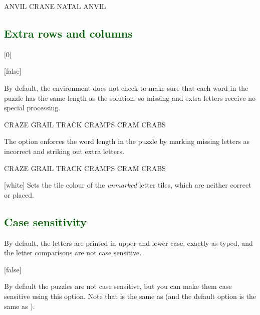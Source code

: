 \documentclass[svgnames]{report}
\newcommand\Section[1]{\subsection{\textcolor{DarkGreen}{#1}}}
\begin{document}
  \begin{example}
    \begin{wordle}[letterstyle={rounded corners}]{ANVIL}
      CRANE
      NATAL
      ANVIL
    \end{wordle}
  \end{example}


  \Section{Extra rows and columns}

  [0]

  [false]

  By default, the  environment does not check to make
  sure that each word in the puzzle has the same length as the solution,
  so missing and extra letters receive no special processing.

  \begin{example}
    \begin{wordle}{CRAZE}
      GRAIL
      TRACK
      CRAMPS
      CRAM
      CRABS
    \end{wordle}
  \end{example}

  The  option enforces the word length in the puzzle by
  marking missing letters as incorrect and striking out extra letters.

  \begin{example}
    \begin{wordle}[strict]{CRAZE}
      GRAIL
      TRACK
      CRAMPS
      CRAM
      CRABS
    \end{wordle}
  \end{example}

  [white]
  Sets the tile colour of the \textit{unmarked }  letter
  tiles, which are neither correct or placed.


  \Section{Case sensitivity}

  By default, the letters are printed in upper and lower case, exactly
  as typed, and the letter comparisons are not case sensitive.

  [false]

  By default the  puzzles are not case sensitive, but
  you can make them case sensitive using this option. Note that
   is the same as 
  (and the default option is the same as
  ).
\end{document}

